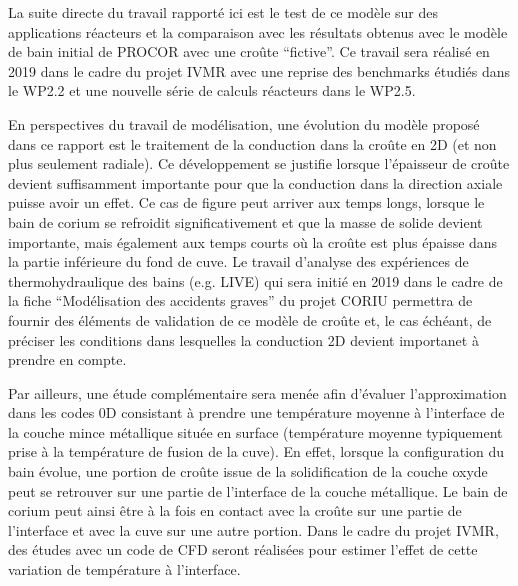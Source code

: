 La suite directe du travail rapporté ici est le test de ce modèle sur des applications réacteurs et la comparaison avec les résultats obtenus avec le modèle de bain initial de PROCOR avec une croûte ``fictive''. Ce travail sera réalisé en 2019 dans le cadre du projet IVMR avec une reprise des benchmarks étudiés dans le WP2.2 et une nouvelle série de calculs réacteurs dans le WP2.5.

En perspectives du travail de modélisation, une évolution du modèle proposé dans ce rapport est le traitement de la conduction dans la croûte en 2D (et non plus seulement radiale). Ce développement se justifie lorsque l'épaisseur de croûte devient suffisamment importante pour que la conduction dans la direction axiale puisse avoir un effet. Ce cas de figure peut arriver aux temps longs, lorsque le bain de corium se refroidit significativement et que la masse de solide devient importante, mais également aux temps courts où la croûte est plus épaisse dans la partie inférieure du fond de cuve. Le travail d'analyse des expériences de thermohydraulique des bains (e.g. LIVE) qui sera initié en 2019 dans le cadre de la fiche ``Modélisation des accidents graves'' du projet CORIU permettra de fournir des éléments de validation de ce modèle de croûte et, le cas échéant, de préciser les conditions dans lesquelles la conduction 2D devient importanet à prendre en compte.

Par ailleurs, une étude complémentaire sera menée afin d'évaluer l'approximation dans les codes 0D consistant à prendre une température moyenne à l'interface de la couche mince métallique située en surface (température moyenne typiquement prise à la température de fusion de la cuve). En effet, lorsque la configuration du bain évolue, une portion de croûte issue de la solidification de la couche oxyde peut se retrouver sur une partie de l'interface de la couche métallique. Le bain de corium peut ainsi être à la fois en contact avec la croûte sur une partie de l'interface et avec la cuve sur une autre portion. Dans le cadre du projet IVMR, des études avec un code de CFD seront réalisées pour estimer l'effet de cette variation de température à l'interface.
